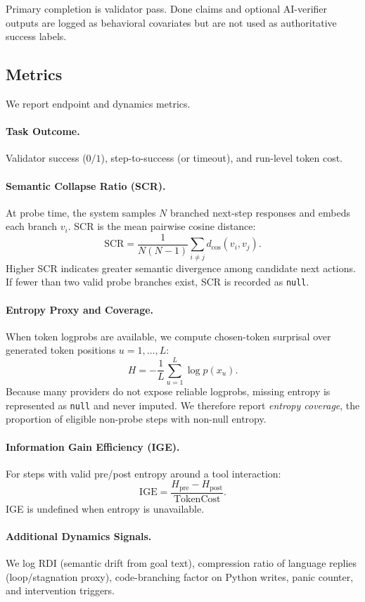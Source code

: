 Primary completion is validator pass. Done claims and optional AI-verifier outputs are logged as behavioral covariates but are not used as authoritative success labels.

\subsection{Metrics}
We report endpoint and dynamics metrics.

\paragraph{Task Outcome.}
Validator success (\(0/1\)), step-to-success (or timeout), and run-level token cost.

\paragraph{Semantic Collapse Ratio (SCR).}
At probe time, the system samples \(N\) branched next-step responses and embeds each branch \(v_i\). SCR is the mean pairwise cosine distance:
\[
\mathrm{SCR} = \frac{1}{N(N-1)}\sum_{i\neq j} d_{\cos}(v_i,v_j).
\]
Higher SCR indicates greater semantic divergence among candidate next actions. If fewer than two valid probe branches exist, SCR is recorded as \texttt{null}.

\paragraph{Entropy Proxy and Coverage.}
When token logprobs are available, we compute chosen-token surprisal over generated token positions \(u=1,\dots,L\):
\[
H = -\frac{1}{L}\sum_{u=1}^{L}\log p(x_u).
\]
Because many providers do not expose reliable logprobs, missing entropy is represented as \texttt{null} and never imputed. We therefore report \emph{entropy coverage}, the proportion of eligible non-probe steps with non-null entropy.

\paragraph{Information Gain Efficiency (IGE).}
For steps with valid pre/post entropy around a tool interaction:
\[
\mathrm{IGE} = \frac{H_{\text{pre}} - H_{\text{post}}}{\text{TokenCost}}.
\]
IGE is undefined when entropy is unavailable.

\paragraph{Additional Dynamics Signals.}
We log RDI (semantic drift from goal text), compression ratio of language replies (loop/stagnation proxy), code-branching factor on Python writes, panic counter, and intervention triggers.

